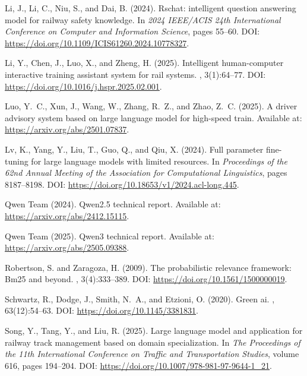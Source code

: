 \documentclass{article}
\begin{document}
\begin{thebibliography}{}
Li, J., Li, C., Niu, S., and Dai, B. (2024).
\newblock Rschat: intelligent question answering model for railway safety
  knowledge.
\newblock In {\em 2024 IEEE/ACIS 24th International Conference on Computer and
  Information Science}, pages 55--60.
\newblock DOI: \url{https://doi.org/10.1109/ICIS61260.2024.10778327}.

Li, Y., Chen, J., Luo, X., and Zheng, H. (2025).
\newblock Intelligent human-computer interactive training assistant system for
  rail systems.
, 3(1):64--77.
\newblock DOI: \url{https://doi.org/10.1016/j.hspr.2025.02.001}.

Luo, Y.~C., Xun, J., Wang, W., Zhang, R.~Z., and Zhao, Z.~C. (2025).
\newblock A driver advisory system based on large language model for high-speed
  train.
\newblock Available at: \url{https://arxiv.org/abs/2501.07837}.

Lv, K., Yang, Y., Liu, T., Guo, Q., and Qiu, X. (2024).
\newblock Full parameter fine-tuning for large language models with limited
  resources.
\newblock In {\em Proceedings of the 62nd Annual Meeting of the Association for
  Computational Linguistics}, pages 8187--8198.
\newblock DOI: \url{https://doi.org/10.18653/v1/2024.acl-long.445}.

{Qwen Team} (2024).
\newblock Qwen2.5 technical report.
\newblock Available at: \url{https://arxiv.org/abs/2412.15115}.

{Qwen Team} (2025).
\newblock Qwen3 technical report.
\newblock Available at: \url{https://arxiv.org/abs/2505.09388}.

Robertson, S. and Zaragoza, H. (2009).
\newblock The probabilistic relevance framework: Bm25 and beyond.
, 3(4):333--389.
\newblock DOI: \url{https://doi.org/10.1561/1500000019}.

Schwartz, R., Dodge, J., Smith, N.~A., and Etzioni, O. (2020).
\newblock Green ai.
, 63(12):54--63.
\newblock DOI: \url{https://doi.org/10.1145/3381831}.

Song, Y., Tang, Y., and Liu, R. (2025).
\newblock Large language model and application for railway track management
  based on domain specialization.
\newblock In {\em The Proceedings of the 11th International Conference on
  Traffic and Transportation Studies}, volume 616, pages 194--204.
\newblock DOI: \url{https://doi.org/10.1007/978-981-97-9644-1_21}.


\end{thebibliography}
\end{document}
